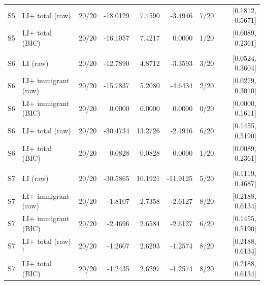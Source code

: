 \begin{table}[htbp]
\begin{tabular}{@{}llrrrrrr@{}}
S5 & LI+ total (raw) & 20/20 & -18.0129 & 7.4590 & -3.4946 & 7/20 & [0.1812, 0.5671] \\
S5 & LI+ total (BIC) & 20/20 & -16.1057 & 7.4217 & 0.0000 & 1/20 & [0.0089, 0.2361] \\
\addlinespace
\multicolumn{8}{@{}l}{\textbf{S6}: mean $N_{\mathrm{train}}=95.80$, $N_{\mathrm{test}}=111.55$} \\
S6 & LI (raw) & 20/20 & -12.7890 & 4.8712 & -3.3593 & 3/20 & [0.0524, 0.3604] \\
S6 & LI+ immigrant (raw) & 20/20 & -15.7837 & 5.2080 & -4.6434 & 2/20 & [0.0279, 0.3010] \\
S6 & LI+ immigrant (BIC) & 20/20 & 0.0000 & 0.0000 & 0.0000 & 0/20 & [0.0000, 0.1611] \\
S6 & LI+ total (raw) & 20/20 & -30.4734 & 13.2726 & -2.1916 & 6/20 & [0.1455, 0.5190] \\
S6 & LI+ total (BIC) & 20/20 & 0.0828 & 0.0828 & 0.0000 & 1/20 & [0.0089, 0.2361] \\
\addlinespace
\multicolumn{8}{@{}l}{\textbf{S7}: mean $N_{\mathrm{train}}=13.30$, $N_{\mathrm{test}}=13.25$} \\
S7 & LI (raw) & 20/20 & -30.5865 & 10.1921 & -11.9125 & 5/20 & [0.1119, 0.4687] \\
S7 & LI+ immigrant (raw) & 20/20 & -1.8107 & 2.7358 & -2.6127 & 8/20 & [0.2188, 0.6134] \\
S7 & LI+ immigrant (BIC) & 20/20 & -2.4696 & 2.6584 & -2.6127 & 6/20 & [0.1455, 0.5190] \\
S7 & LI+ total (raw)$^{\dagger}$ & 20/20 & -1.2607 & 2.6293 & -1.2574 & 8/20 & [0.2188, 0.6134] \\
S7 & LI+ total (BIC) & 20/20 & -1.2435 & 2.6297 & -1.2574 & 8/20 & [0.2188, 0.6134] \\
\bottomrule
\end{tabular}
\end{table}

